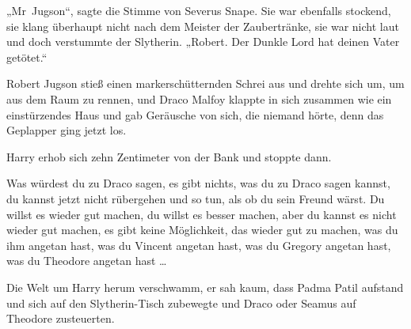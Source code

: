 „Mr~Jugson“, sagte die Stimme von Severus Snape.
Sie war ebenfalls stockend, sie klang überhaupt nicht nach dem Meister der Zaubertränke, sie war nicht laut und doch verstummte der Slytherin.
„Robert. Der Dunkle Lord hat deinen Vater getötet.“

Robert Jugson stieß einen markerschütternden Schrei aus und drehte sich um, um aus dem Raum zu rennen, und Draco Malfoy klappte in sich zusammen wie ein einstürzendes Haus und gab Geräusche von sich, die niemand hörte, denn das Geplapper ging jetzt los.

Harry erhob sich zehn Zentimeter von der Bank und stoppte dann.

Was würdest du zu Draco sagen, es gibt nichts, was du zu Draco sagen kannst, du kannst jetzt nicht rübergehen und so tun, als ob du sein Freund wärst.
Du willst es wieder gut machen, du willst es besser machen, aber du kannst es nicht wieder gut machen, es gibt keine Möglichkeit, das wieder gut zu machen, was du ihm angetan hast, was du Vincent angetan hast, was du Gregory angetan hast, was du Theodore angetan hast …

Die Welt um Harry herum verschwamm, er sah kaum, dass Padma Patil aufstand und sich auf den Slytherin-Tisch zubewegte und Draco oder Seamus auf Theodore zusteuerten.

